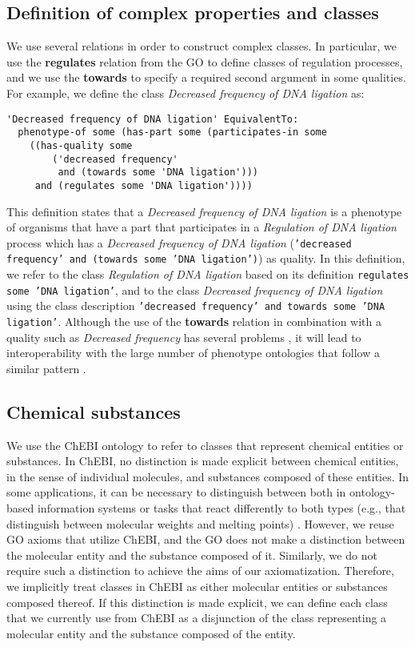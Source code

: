 \documentclass{bioinfo}
\renewcommand{\cite}{\citep}
\begin{document}
\subsection{Definition of complex properties and classes}
We use several relations in order to construct complex classes. In
particular, we use the {\bf regulates} relation from the GO to define
classes of regulation processes, and we use the {\bf towards} to
specify a required second argument in some qualities. 
For example, we define the class {\em Decreased frequency of DNA
  ligation} as:
\begin{verbatim}
'Decreased frequency of DNA ligation' EquivalentTo:
  phenotype-of some (has-part some (participates-in some 
    ((has-quality some 
        ('decreased frequency'
         and (towards some 'DNA ligation')))
     and (regulates some 'DNA ligation'))))
\end{verbatim}
This definition states that a {\em Decreased frequency of DNA
  ligation} is a phenotype of organisms that have a part that
participates in a {\em Regulation of DNA ligation} process which has a
{\em Decreased frequency of DNA ligation} ({\tt 'decreased frequency'
  and (towards some 'DNA ligation')}) as quality. In this definition,
we refer to the class {\em Regulation of DNA ligation} based on its
definition {\tt regulates some 'DNA ligation'}, and to the class {\em
  Decreased frequency of DNA ligation} using the class description
{\tt 'decreased frequency' and towards some 'DNA ligation'}. Although
the use of the {\bf towards} relation in combination with a quality
such as {\em Decreased frequency} has several problems
\cite{obml2011h3}, it will lead to interoperability with the large
number of phenotype ontologies that follow a similar pattern
\cite{Mungall2010}.

\subsection{Chemical substances}
We use the ChEBI ontology \cite{Degtyarenko2007} to refer to classes
that represent chemical entities or substances. In ChEBI, no
distinction is made explicit between chemical entities, in the sense
of individual molecules, and substances composed of these entities.
In some applications, it can be necessary to distinguish between both
in ontology-based information systems or tasks that react differently
to both types (e.g., that distinguish between molecular weights and
melting points) \cite{}. However, we reuse GO axioms that utilize
ChEBI, and the GO does not make a distinction between the molecular
entity and the substance composed of it. Similarly, we do not require
such a distinction to achieve the aims of our
axiomatization. Therefore, we implicitly treat classes in ChEBI as either
molecular entities or substances composed thereof. If this distinction
is made explicit, we can define each class that we currently use from
ChEBI as a disjunction of the class representing a molecular entity
and the substance composed of the entity.
\end{document}
